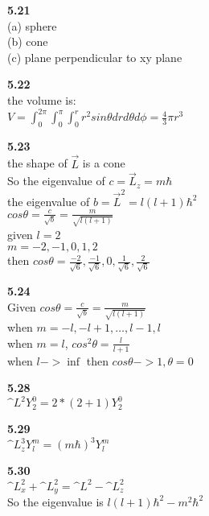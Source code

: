 \documentclass{article}
\begin{document}
\textbf{5.21}\\
(a) sphere\\
(b) cone\\
(c) plane perpendicular to xy plane\\
\newline

\textbf{5.22}\\
the volume is:\\
$V = \int_0^{2\pi}\int_0^{\pi}\int_0^r r^2sin\theta drd\theta d\phi = \frac{4}{3}\pi r^3$\\
\newline

\textbf{5.23}\\
the shape of $\overrightarrow L$ is a cone\\
So the eigenvalue of $c = \overrightarrow L_z = m\hbar$\\
the eigenvalue of $b = \overrightarrow L^2 = l(l+1)\hbar^2$\\
$cos\theta = \frac{c}{\sqrt{b}} = \frac{m}{\sqrt{l(l+1)}}$\\
given $l = 2$\\
$m = -2,-1,0,1,2$\\
then $cos \theta = \frac{-2}{\sqrt{6}}, \frac{-1}{\sqrt{6}}, 0, \frac{1}{\sqrt{6}}, \frac{2}{\sqrt{6}}$\\
\newline

\textbf{5.24}\\
Given $cos\theta = \frac{c}{\sqrt{b}} = \frac{m}{\sqrt{l(l+1)}}$\\
when $m = -l, -l+1, \dots, l-1, l$\\
when $m = l$, $cos^2\theta = \frac{l}{l+1}$\\
when $l -> \inf$ then $cos\theta -> 1, \theta = 0$\\
\newline

\textbf{5.28}\\
$\^{L}^2Y^0_2 = 2*(2+1)Y^0_2$\\
\newline

\textbf{5.29}\\
$\^{L}_z^3Y^m_l = (m\hbar)^3Y^m_l$\\
\newline

\textbf{5.30}\\
$\^{L}_x^2+\^{L}_y^2 = \^{L}^2 - \^{L}_z^2$\\
So the eigenvalue is $l(l+1)\hbar^2 - m^2\hbar^2$\\
\newline
\end{document}
